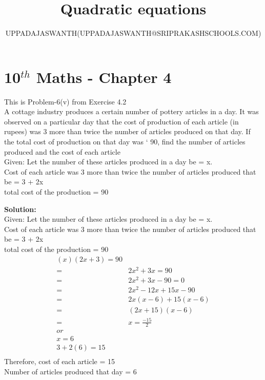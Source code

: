 \documentclass[12pt]{article}
\title{Quadratic equations}
\author{UPPADAJASWANTH(UPPADAJASWANTH@SRIPRAKASHSCHOOLS.COM)}
\newcommand{\solution}{\noindent \textbf{Solution: }}
\begin{document}
\section*{10$^{th}$ Maths - Chapter 4}
This is Problem-6(v) from Exercise 4.2\\
A cottage industry produces a certain number of pottery articles in a day. It was observed
on a particular day that the cost of production of each article (in rupees) was 3 more than
twice the number of articles produced on that day. If the total cost of production on that
day was ` 90, find the number of articles produced and the cost of each article\\
Given:
Let the number of these articles produced in a day be = x.\\
Cost of each article was 3 more than twice the number of articles
produced that be = 3 + 2x\\
total cost of the production = 90

\solution\\
Given:
Let the number of these articles produced in a day be = x.\\
Cost of each article was 3 more than twice the number of articles
produced that be = 3 + 2x\\
total cost of the production = 90\\
\begin{align}
{(x)(2x + 3) = 90}\\=&
{2x^2+3x=90}\\=&
{2x^2+3x-90=0}\\=&
{2x^2-12x+15x-90}\\=&
{2x(x-6)+15(x-6)}\\=&
{(2x+15)(x-6)}\\=&
{x=\frac{-15}{2}}\\
or\\
{x=6}\\
{3+2(6)=15}\\
\end{align}
Therefore, cost of each article = 15\\
Number of articles produced that day = 6\\
\end{document}
